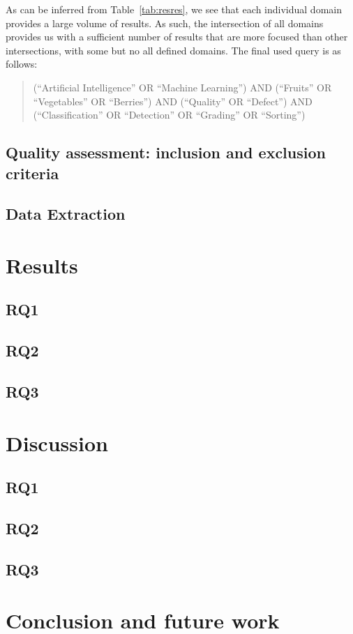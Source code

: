 \documentclass[conference]{IEEEtran}
\begin{document}
As can be inferred from Table~\ref{tab:resres}, we see that each individual domain provides a large volume of results. As such, the intersection of all domains provides us with a sufficient number of results that are more focused than other intersections, with some but no all defined domains. The final used query is as follows:

\begin{quote}
 (``Artificial Intelligence'' OR ``Machine Learning'') AND (``Fruits'' OR ``Vegetables'' OR ``Berries'') AND (``Quality'' OR ``Defect'') AND (``Classification'' OR ``Detection'' OR ``Grading'' OR ``Sorting'')
\end{quote}

\subsection{Quality assessment: inclusion and exclusion criteria}

\subsection{Data Extraction}

\section{Results}
\label{sec:res}

\subsection{RQ1}
\subsection{RQ2}
\subsection{RQ3}

\section{Discussion}
\label{sec:disc}

\subsection{RQ1}
\subsection{RQ2}
\subsection{RQ3}

\section{Conclusion and future work}
\label{sec:conc}



\end{document}

